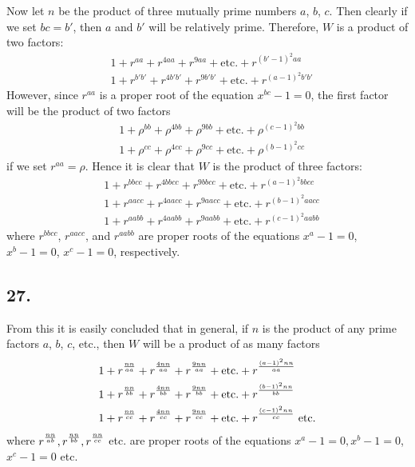 \documentclass[twoside,12pt]{memoir}
\let\oldfrac\frac
\def\frac#1#2{\mathchoice{\tfrac{#1}{#2}}{\oldfrac{#1}{#2}}{\genfrac{}{}{}{2}{#1}{#2\mathstrut}}{\genfrac{}{}{}{3}{#1}{#2\mathstrut}}}
\begin{document}
Now let \(n\) be the product of three mutually prime numbers \(a\), \(b\), \(c\).  Then clearly if we set \(bc = b'\), then \(a\) and \(b'\) will be relatively prime.  Therefore, \(W\) is a product of two factors:
\[\begin{aligned}
& 1+r^{aa}+r^{4aa}+r^{9aa}+\text{etc{.}}+r^{(b'-1)^2aa} \\
& 1+r^{b'b'}+r^{4b'b'}+r^{9b'b'}+\text{etc{.}}+r^{(a-1)^2b'b'}
\end{aligned}\]
However, since \(r^{aa}\) is a proper root of the equation \(x^{bc} - 1 = 0\), the first factor will be the product of two factors
\[\begin{aligned}
& 1+\rho^{bb}+\rho^{4bb}+\rho^{9bb}+\text{etc{.}}+\rho^{(c-1)^2bb} \\
& 1+\rho^{cc}+\rho^{4cc}+\rho^{9cc}+\text{etc{.}}+\rho^{(b-1)^2cc}
\end{aligned}\]
if we set \(r^{aa} = \rho\). Hence it is clear that \(W\) is the product of three factors:
\[\begin{aligned}
& 1+r^{bbcc}+r^{4bbcc}+r^{9bbcc}+\text{etc{.}}+r^{(a-1)^2bbcc} \\
& 1+r^{aacc}+r^{4aacc}+r^{9aacc}+\text{etc{.}}+r^{(b-1)^2aacc} \\
& 1+r^{aabb}+r^{4aabb}+r^{9aabb}+\text{etc{.}}+r^{(c-1)^2aabb}
\end{aligned}\]
where \(r^{bbcc}\), \(r^{aacc}\), and \(r^{aabb}\) are proper roots of the equations \(x^a - 1 = 0\), \(x^b - 1 = 0\), \(x^c - 1 = 0\), respectively.

\subsection*{27.}

From this it is easily concluded that in general, if \(n\) is the product of any prime factors \(a\), \(b\), \(c\), etc{.}, then \(W\) will be a product of as many factors
\[\begin{aligned}
& 1+r^{\frac{n n}{a a}}+r^{\frac{4 n n}{a a}}+r^{\frac{9 n n}{a a}}+\text{etc{.}}+r^{\frac{(a-1)^{2} n n}{a a}} \\
& 1+r^{\frac{n n}{b b}}+r^{\frac{4 n n}{b b}}+r^{\frac{9 n n}{b b}}+\text{etc{.}}+r^{\frac{(b-1)^{2} n n}{b b}} \\
& 1+r^{\frac{n n}{c c}}+r^{\frac{4 n n}{c c}}+r^{\frac{9 n n}{c c}}+\text{etc{.}}+r^{\frac{(c-1)^{2} n n}{c c}} \text{ etc{.}}
\end{aligned}\]
where \(r^{\frac{n n}{a b}}, r^{\frac{n n}{ b b}}, r^{\frac{n n}{c c}}\) etc{.} are proper roots of the equations \(x^{a}-1=0, x^{b}-1=0\), \(x^{c}-1=0\) etc{.}
\end{document}
